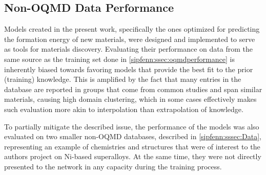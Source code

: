 \subsection{Non-OQMD Data Performance} \label{sipfenn:ssec:sigmasqsperformance}

Models created in the present work, specifically the ones optimized for predicting the formation energy of new materials, were designed and implemented to serve as tools for materials discovery. Evaluating their performance on data from the same source as the training set done in \ref{sipfenn:ssec:oqmdperformance} is inherently biased towards favoring models that provide the best fit to the prior (training) knowledge. This is amplified by the fact that many entries in the database are reported in groups that come from common studies and span similar materials, causing high domain clustering, which in some cases effectively makes such evaluation more akin to interpolation than extrapolation of knowledge.

To partially mitigate the described issue, the performance of the models was also evaluated on two smaller non-OQMD databases, described in \ref{sipfenn:sssec:Data}, representing an example of chemistries and structures that were of interest to the authors project on Ni-based superalloys. At the same time, they were not directly presented to the network in any capacity during the training process.

